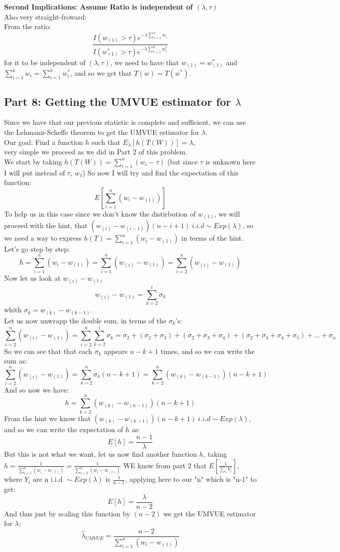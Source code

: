 \documentclass[12pt]{article}
\begin{document}
\textbf{Second Implications: Assume Ratio is independent of $(\lambda,\tau)$}\\
Also very straight-froward: \\ 
From the ratio: 
\[
  \frac{I(w_{(1)}>\tau)e^{-\lambda\sum_{i=1}^{k}w_i}}{I(w^*_{(1)}>\tau)e^{-\lambda\sum_{i=1}^{k}w^*_i}}
\]
for it to be independent of $(\lambda,\tau)$, we need to have that $w_{(1)} = w^*_{(1)}$ and $\sum_{i=1}^{k}w_i = \sum_{i=1}^{k}w^*_i$, and so we get that $T(w) = T(w^*)$. \\
\subsection*{Part 8: Getting the UMVUE estimator for $\lambda$}
Since we have that our previous statistic is complete and sufficient, we can use the Lehmann-Scheffe theorem to get the UMVUE estimator for $\lambda$. \\
Our goal:  Find a function $h$ such that $E_\lambda[h(T(W))] = \lambda$, \\ very simple we proceed as we did in Part 2 of this problem. \\ 
We start by taking $h(T(W)) = \sum_{i=1}^{n}(w_i-\tau)$ (but since $\tau$ is unknown here I will put instead of $\tau$, $w_{1}$)
So now I will try and find the expectation of this function:
\[
E[\sum_{i=1}^{n}(w_i - w_{(1)})]
\]
To help us in this case since we don't know the distirbution of $w_{(1)}$, we will proceed with the hint, that $(w_{(i)}- w_{(i-1)})(n-i+1)\ i.i.d \sim Exp(\lambda)$, so we need a way to express $h(T) = \sum_{i=1}^{n}(w_i-w_{(1)})$ in terms of the hint. Let's go step by step:
\[
h = \sum_{i=1}^{n}(w_i-w_{(1)}) = \sum_{i=1}^{n}(w_{(i)}-w_{(1)}) = \sum_{i=2}^{n}(w_{(i)}-w_{(1)})
\]
Now let us look at $w_{(i)}-w_{(1)}$
\[
  w_{(i)}-w_{(1)} = \sum_{k=2}^{i}\sigma_k
\]
whith $\sigma_k = w_{(k)}-w_{(k-1)}$. \\
Let us now unwrapp the double sum, in terms of the $\sigma_k$'s:
\[
\sum_{i=2}^{n}(w_{(i)}-w_{(1)}) = \sum_{i=2}^{n}\sum_{k=2}^{i}\sigma_k = \sigma_2 + (\sigma_2 + \sigma_3) + (\sigma_2 + \sigma_3 + \sigma_4) + (\sigma_2 + \sigma_3 + \sigma_4 + \sigma_5) + \dots + \sigma_n
\]
So we can see that that each $\sigma_k$ appears $n-k+1$ times, and so we can write the sum as:
\[
\sum_{i=2}^{n}(w_{(i)}-w_{(1)}) = \sum_{k=2}^{n}\sigma_k(n-k+1) = \sum_{k=2}^{n} ( w_{(k)}-w_{(k-1)})(n-k+1)
\]
And so now we have: 
\[
h = \sum_{k=2}^{n} ( w_{(k)}-w_{(k-1)})(n-k+1)
\]
From the hint we know that $( w_{(k)}-w_{(k-1)})(n-k+1) \ i.i.d \sim Exp(\lambda)$, and so we can write the expectation of $h$ as:
\[
E[h] =  \frac{n-1}{\lambda} 
\]
But this is not what we want, let us now find another function $h$, taking $h = \frac{1}{\sum_{i=1}^{n}(w_i-w_{(1)})}= \frac{1}{\sum_{i=2}^{n}(w_i-w_{(1)})}$
WE know from part 2 that $E[\frac{1}{\sum_i Y_i}]$, where $Y_i \text{ are n i.i.d }\sim Exp(\lambda)$ is $\frac{\lambda}{n-1}$, applying here to our "n" which is "n-1" to get: 
\[
E[h] = \frac{\lambda}{n-2}
\]
And thus just by scaling this function by $(n-2)$ we get the UMVUE estimator for $\lambda$:
\[
\hat{\lambda}_{UMVUE} = \frac{n-2}{\sum_{i=1}^{n}(w_i-w_{(1)})}
\]
\end{document}
